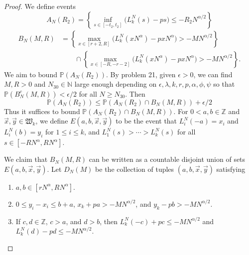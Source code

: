 \documentclass[12pt]{article}
\begin{document}
	\begin{proof}
		We define events
		\[
		A_N(R_2) = \left\{\inf_{s \in [ -t_2, t_2 ]}\big(L^N_k(s) - p s \big) \leq - R_2N^{\alpha/2}\right\}
		\]
		\begin{align*}
		B_N(M,R) &= \left\{ \max_{x\in [r+2, R]} \big(L^N_k(xN^\alpha) - pxN^\alpha\big) > -MN^{\alpha/2} \right\}\\
		&\qquad \cap \left\{ \max_{x\in [-R, -r-2]} \big(L^N_k(xN^\alpha) - pxN^\alpha\big) > -MN^{\alpha/2} \right\}.
		\end{align*}
		We aim to bound $\mathbb{P}(A_N(R_2))$. By problem 21, given $\epsilon > 0$, we can find $M,R>0$ and $N_{30}\in\mathbb{N}$ large enough depending on $\epsilon,\lambda,k,r,p,\alpha,\phi,\psi$ so that $\mathbb{P}(B_N^c(M,R)) < \epsilon/2$ for all $N\geq N_{30}$. Then
		\begin{equation}
		\mathbb{P}(A_N(R_2)) \leq \mathbb{P}(A_N(R_2)\cap B_N(M,R)) + \epsilon/2 \label{4.3cases}
		\end{equation}
		Thus it suffices to bound $\mathbb{P}(A_N(R_2)\cap B_N(M,R))$. For $0<a,b\in\mathbb{Z}$ and $\vec{x},\vec{y}\in\mathfrak{W}_k$, we define $E(a,b,\vec{x},\vec{y})$ to be the event that $L_i^N(-a) = x_i$ and $L_i^N(b) = y_i$ for $1\leq i\leq k$, and $L_1^N(s) > \cdots > L_k^N(s)$ for all $s\in[-RN^\alpha,RN^\alpha]$.
		
		We claim that $B_N(M,R)$ can be written as a countable disjoint union of sets $E(a,b,\vec{x},\vec{y})$. Let $D_N(M)$ be the collection of tuples $(a,b,\vec{x},\vec{y})$ satisfying 
		\begin{enumerate}[label=(\arabic*)]
			
			\item $a,b\in[rN^\alpha,RN^\alpha]$.
			
			\item $0 \leq y_i - x_i \leq b+a$, $x_k + pa > - MN^{\alpha/2}$, and $y_k - pb > - MN^{\alpha/2}$.
			
			\item If $c,d\in\mathbb{Z}$, $c > a$, and $d>b$, then $L_k^N(-c) + pc \leq -MN^{\alpha/2}$ and $L_k^N(d) - pd \leq -MN^{\alpha/2}$.
			

\end{enumerate}
\end{proof}
\end{document}
